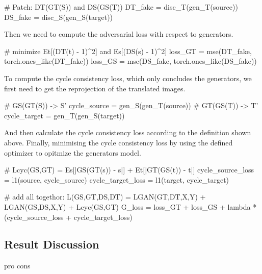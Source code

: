 \begin{python}
# Patch: DT(GT(S)) and DS(GS(T)) 
DT_fake = disc_T(gen_T(source))
DS_fake = disc_S(gen_S(target))
\end{python}

Then we need to compute the adversarial loss with respect to generators.

\begin{python}
# minimize Et[(DT(t) - 1)^2] and Es[(DS(s) - 1)^2]
loss_GT = mse(DT_fake, torch.ones_like(DT_fake))
loss_GS = mse(DS_fake, torch.ones_like(DS_fake))
\end{python}

To compute the cycle consistency loss, which only concludes the generators, we first need to get the reprojection of the translated images.

\begin{python}
# GS(GT(S)) -> S'
cycle_source = gen_S(gen_T(source))
# GT(GS(T)) -> T'
cycle_target = gen_T(gen_S(target))
\end{python}

And then calculate the cycle consistency loss according to the definition shown above. Finally, minimising the cycle consistency loss by using the defined optimizer to opitmize the generators model.

\begin{python}
# Lcyc(GS,GT) = Es[|GS(GT(s)) - s|] + Et[|GT(GS(t)) - t|]
cycle_source_loss = l1(source, cycle_source)
cycle_target_loss = l1(target, cycle_target)

# add all togethor: L(GS,GT,DS,DT) = LGAN(GT,DT,X,Y) + LGAN(GS,DS,X,Y) + Lcyc(GS,GT)
G_loss = loss_GT + loss_GS +  
         lambda * (cycle_source_loss + cycle_target_loss) 
\end{python}

\subsection{Result Discussion}
pro cons
\newpage
